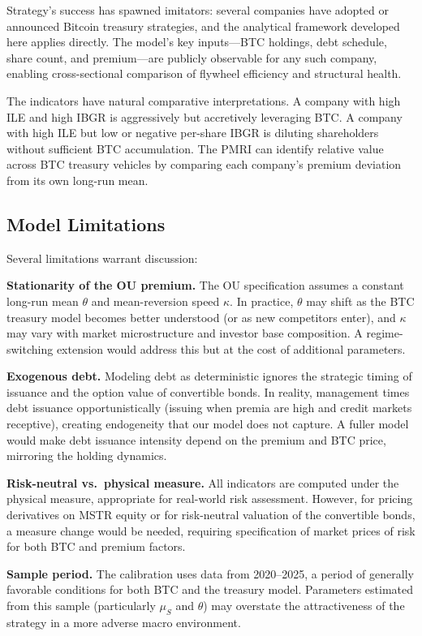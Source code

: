 Strategy's success has spawned imitators: several companies have adopted or announced Bitcoin treasury strategies, and the analytical framework developed here applies directly. The model's key inputs---BTC holdings, debt schedule, share count, and premium---are publicly observable for any such company, enabling cross-sectional comparison of flywheel efficiency and structural health.

The indicators have natural comparative interpretations. A company with high ILE and high IBGR is aggressively but accretively leveraging BTC. A company with high ILE but low or negative per-share IBGR is diluting shareholders without sufficient BTC accumulation. The PMRI can identify relative value across BTC treasury vehicles by comparing each company's premium deviation from its own long-run mean.

\subsection{Model Limitations}

Several limitations warrant discussion:

\textbf{Stationarity of the OU premium.} The OU specification assumes a constant long-run mean $\theta$ and mean-reversion speed $\kappa$. In practice, $\theta$ may shift as the BTC treasury model becomes better understood (or as new competitors enter), and $\kappa$ may vary with market microstructure and investor base composition. A regime-switching extension would address this but at the cost of additional parameters.

\textbf{Exogenous debt.} Modeling debt as deterministic ignores the strategic timing of issuance and the option value of convertible bonds. In reality, management times debt issuance opportunistically (issuing when premia are high and credit markets receptive), creating endogeneity that our model does not capture. A fuller model would make debt issuance intensity depend on the premium and BTC price, mirroring the holding dynamics.

\textbf{Risk-neutral vs.\ physical measure.} All indicators are computed under the physical measure, appropriate for real-world risk assessment. However, for pricing derivatives on MSTR equity or for risk-neutral valuation of the convertible bonds, a measure change would be needed, requiring specification of market prices of risk for both BTC and premium factors.

\textbf{Sample period.} The calibration uses data from 2020--2025, a period of generally favorable conditions for both BTC and the treasury model. Parameters estimated from this sample (particularly $\mu_S$ and $\theta$) may overstate the attractiveness of the strategy in a more adverse macro environment.


